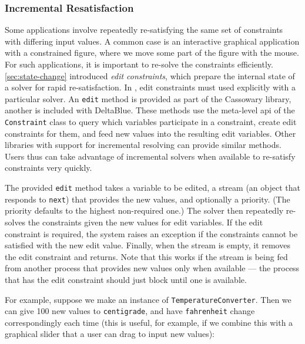\subsubsection{Incremental Resatisfaction}
Some applications involve repeatedly re-satisfying the same set of
constraints with differing input values.  A common case is an
interactive graphical application with a constrained figure, where we
move some part of the figure with the mouse.  For such applications,
it is important to re-solve the constraints
efficiently. \autoref{sec:state-change} introduced \emph{edit
  constraints}, which prepare the internal state of a solver for rapid
re-satisfaction.
In \toolname, edit constraints must used explicitly with a particular
solver. An \lstinline{edit} method is provided as part of the
Cassowary library, another is included with DeltaBlue.  These methods
use the meta-level \ac{api} of the \lstinline{Constraint} class to
query which variables participate in a constraint, create edit
constraints for them, and feed new values into the resulting edit
variables.  Other libraries with support for incremental resolving can
provide similar methods. Users thus can take advantage of incremental
solvers when available to re-satisfy constraints very quickly.

The provided \lstinline{edit} method takes a variable to be edited, a
stream (an object that responds to \lstinline{next}) that provides the
new values, and optionally a priority.  (The priority defaults to the
highest non-required one.)  The solver then repeatedly re-solves 
the constraints given the new values for edit variables.  If the edit
constraint is required, the system
raises an exception if the constraints cannot be satisfied with the
new edit value.  Finally, when the
stream is empty, it removes the edit constraint and returns.  Note
that this works if the stream is being fed from another process that
provides new values only when available --- the process that has the
edit constraint should just block until one is available.

For example, suppose we make an instance of
\lstinline{TemperatureConverter}.  Then we can give 100 new values to
\lstinline{centigrade}, and have \lstinline{fahrenheit} change
correspondingly each time (this is useful, for example, if we combine
this with a graphical slider that a user can drag to input new
values):

